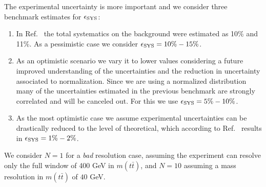 \documentclass[aps,prd,amsmath,amssymb,superscriptaddress, preprintnumbers,preprint,nofootinbib,a4paper]{revtex4}
\begin{document}
The experimental uncertainty is more important and we consider three benchmark estimates for $\epsilon_{\rm SYS}$: 
%
\begin{enumerate}
\item In Ref.~\cite{Aaboud:2017hnm} the total systematics on the background were estimated as 10\% and 11\%.
As a pessimistic case we consider $\epsilon_{\rm SYS}=10\%-15\%$. 
\item As an optimistic scenario we vary it to lower values considering a future improved understanding of the uncertainties
  and the reduction in uncertainty associated to normalization. Since we are using a normalized distribution many of the uncertainties estimated in the previous benchmark are strongly correlated and will be canceled out. For this we use
  $\epsilon_{\rm SYS}=5\%-10\%$.
\item As the  most optimistic case we assume experimental uncertainties can be drastically reduced to the level of theoretical, which according to Ref.~\cite{Czakon:2017wor} results in $\epsilon_{\rm SYS}=1\%-2\%$. 
\end{enumerate}

We consider $N=1$ for a \emph{bad} resolution case, assuming the experiment can resolve only the full window of 400 GeV in $m(t\bar{t})$, and $N=10$ assuming a mass resolution in $m(t\bar{t})$ of $40$ GeV.
\end{document}
